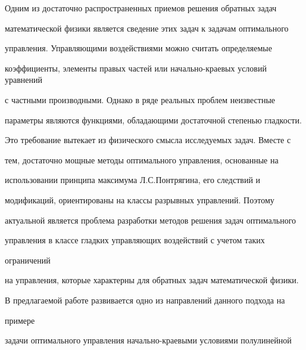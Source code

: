\date{}




\pagestyle{plain} %







\maketitle


\label{begin}








Одним из достаточно распространенных приемов решения обратных задач 


математической физики является сведение этих задач к задачам оптимального


управления. Управляющими воздействиями можно считать определяемые 


коэффициенты, элементы правых частей или начально-краевых условий уравнений


с частными производными. Однако в ряде реальных проблем неизвестные


параметры являются функциями, обладающими достаточной степенью гладкости.


Это требование вытекает из физического смысла исследуемых задач. Вместе с


тем, достаточно мощные методы оптимального управления, основанные на


использовании принципа максимума Л.С.Понтрягина, его следствий и


модификаций, ориентированы на классы разрывных управлений. Поэтому


актуальной является проблема разработки методов решения задач оптимального


управления в классе гладких управляющих воздействий с учетом таких


ограничений


на управления, которые характерны для обратных задач математической физики.





В предлагаемой работе развивается одно из направлений данного подхода на


примере


задачи оптимального управления начально-краевыми условиями полулинейной


